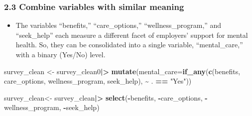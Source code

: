 \documentclass[
]{article}
\newenvironment{Shaded}{\begin{snugshade}}{\end{snugshade}}
\newcommand{\AttributeTok}[1]{\textcolor[rgb]{0.13,0.29,0.53}{#1}}
\newcommand{\CommentTok}[1]{\textcolor[rgb]{0.56,0.35,0.01}{\textit{#1}}}
\newcommand{\FunctionTok}[1]{\textcolor[rgb]{0.13,0.29,0.53}{\textbf{#1}}}
\newcommand{\NormalTok}[1]{#1}
\newcommand{\OtherTok}[1]{\textcolor[rgb]{0.56,0.35,0.01}{#1}}
\newcommand{\SpecialCharTok}[1]{\textcolor[rgb]{0.81,0.36,0.00}{\textbf{#1}}}
\newcommand{\StringTok}[1]{\textcolor[rgb]{0.31,0.60,0.02}{#1}}
\providecommand{\tightlist}{%
  \setlength{\itemsep}{0pt}\setlength{\parskip}{0pt}}
\begin{document}
\begin{Shaded}
\end{Shaded}

\subsubsection{2.3 Combine variables with similar
meaning}\label{combine-variables-with-similar-meaning}

\begin{itemize}
\tightlist
\item
  The variables ``benefits,'' ``care\_options,'' ``wellness\_program,''
  and ``seek\_help'' each measure a different facet of employers'
  support for mental health. So, they can be consolidated into a single
  variable, ``mental\_care,'' with a binary (Yes/No) level.
\end{itemize}

\begin{Shaded}
\begin{Highlighting}[]
\NormalTok{survey\_clean }\OtherTok{\textless{}{-}}\NormalTok{ survey\_clean0}\SpecialCharTok{|\textgreater{}}
  \FunctionTok{mutate}\NormalTok{(}\AttributeTok{mental\_care=}\FunctionTok{if\_any}\NormalTok{(}\FunctionTok{c}\NormalTok{(benefits, care\_options, wellness\_program, seek\_help), }\SpecialCharTok{\textasciitilde{}}\NormalTok{ . }\SpecialCharTok{==} \StringTok{"Yes"}\NormalTok{))}

\NormalTok{survey\_clean}\OtherTok{\textless{}{-}}\NormalTok{ survey\_clean}\SpecialCharTok{|\textgreater{}} 
  \FunctionTok{select}\NormalTok{(}\SpecialCharTok{{-}}\NormalTok{benefits, }\SpecialCharTok{{-}}\NormalTok{care\_options, }\SpecialCharTok{{-}}\NormalTok{wellness\_program, }\SpecialCharTok{{-}}\NormalTok{seek\_help)}
\end{Highlighting}
\end{Shaded}
\end{document}
